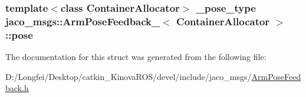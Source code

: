 \subsubsection[{\texorpdfstring{pose}{pose}}]{\setlength{\rightskip}{0pt plus 5cm}template$<$class Container\+Allocator$>$ {\bf \+\_\+pose\+\_\+type} {\bf jaco\+\_\+msgs\+::\+Arm\+Pose\+Feedback\+\_\+}$<$ Container\+Allocator $>$\+::pose}\hypertarget{structjaco__msgs_1_1ArmPoseFeedback___a4a015f6a23c7830eff5fcb0036c1d98a}{}\label{structjaco__msgs_1_1ArmPoseFeedback___a4a015f6a23c7830eff5fcb0036c1d98a}


The documentation for this struct was generated from the following file\+:\begin{DoxyCompactItemize}
\item 
D\+:/\+Longfei/\+Desktop/catkin\+\_\+\+Kinova\+R\+O\+S/devel/include/jaco\+\_\+msgs/\hyperlink{ArmPoseFeedback_8h}{Arm\+Pose\+Feedback.\+h}\end{DoxyCompactItemize}
